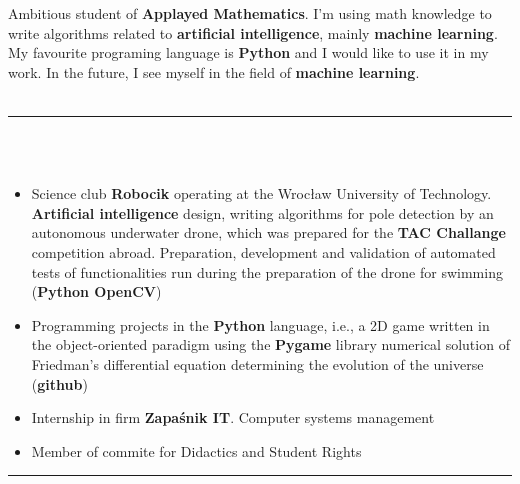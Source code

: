 \documentclass[10pt]{article}
\begin{document}
    \begin{minipage}[t]{0.60\textwidth}
        \newline

        \fontsize{10pt}{10pt}
        Ambitious student of \textbf{Applayed Mathematics}. I'm using math 
         knowledge 
        to write algorithms related to \textbf{artificial intelligence},
        mainly \textbf{machine learning}.
        My favourite programing language is \textbf{Python} and I would like to use it in my work. In the future, I see myself in the field of \textbf{machine learning}. \\ \\
        \rule{11cm}{1pt} \\ \\
        \fontsize{10pt}{10pt}
        \begin{itemize}[leftmargin=*]
            \setlength{\parskip}{0pt}
            \item Science club \textbf{Robocik} operating at the Wrocław University of Technology.
            \textbf{Artificial intelligence} design, writing algorithms for pole detection
            by an autonomous underwater drone, which was prepared for the \textbf{TAC Challange}
            competition abroad. Preparation, development and validation of automated tests of
            functionalities run during the preparation of the drone for swimming (\textbf{Python OpenCV})
            \item Programming projects in the \textbf{Python} language, i.e., a 2D game written
            in the object-oriented paradigm using the \textbf{Pygame} library
            numerical solution of Friedman's differential equation
            determining the evolution of the universe (\textbf{github})
            \item Internship in firm \textbf{Zapaśnik IT}. Computer systems management
            \item Member of commite for Didactics and Student Rights
        \end{itemize}
        \rule{11cm}{1pt} \\ \\
        \fontsize{10pt}{10pt}

\end{minipage}
\end{document}
